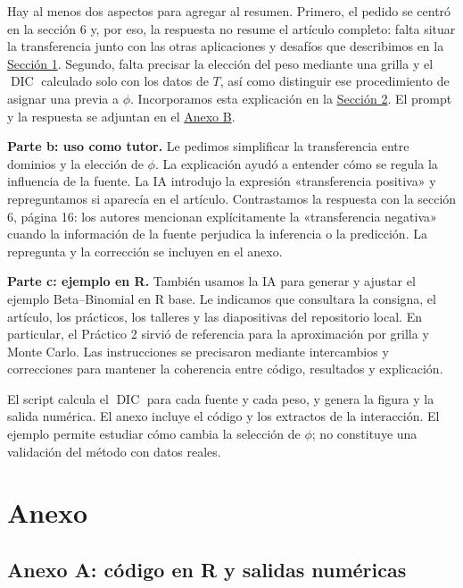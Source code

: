 \documentclass[10pt,a4paper]{article}
\newcommand{\DIC}{\operatorname{DIC}}
\newcommand{\etapa}[1]{\par\smallskip\textbf{#1.}\quad}
\begin{document}
Hay al menos dos aspectos para agregar al resumen. Primero, el pedido se centró en la sección 6 y, por eso, la respuesta no resume el artículo completo: falta situar la transferencia junto con las otras aplicaciones y desafíos que describimos en la \hyperref[sec:ideas]{Sección 1}. Segundo, falta precisar la elección del peso mediante una grilla y el $\DIC$ calculado solo con los datos de $T$, así como distinguir ese procedimiento de asignar una previa a $\phi$. Incorporamos esta explicación en la \hyperref[sec:resultado]{Sección 2}. El prompt y la respuesta se adjuntan en el \hyperref[anexo:ia]{Anexo B}.

\etapa{Parte b: uso como tutor}
Le pedimos simplificar la transferencia entre dominios y la elección de $\phi$. La explicación ayudó a entender cómo se regula la influencia de la fuente. La IA introdujo la expresión «transferencia positiva» y repreguntamos si aparecía en el artículo. Contrastamos la respuesta con la sección 6, página 16: los autores mencionan explícitamente la «transferencia negativa» cuando la información de la fuente perjudica la inferencia o la predicción. La repregunta y la corrección se incluyen en el anexo.

\etapa{Parte c: ejemplo en R}
También usamos la IA para generar y ajustar el ejemplo Beta--Binomial en R base. Le indicamos que consultara la consigna, el artículo, los prácticos, los talleres y las diapositivas del repositorio local. En particular, el Práctico 2 sirvió de referencia para la aproximación por grilla y Monte Carlo. Las instrucciones se precisaron mediante intercambios y correcciones para mantener la coherencia entre código, resultados y explicación.

El script  calcula el $\DIC$ para cada fuente y cada peso, y genera la figura y la salida numérica. El anexo incluye el código y los extractos de la interacción. El ejemplo permite estudiar cómo cambia la selección de $\phi$; no constituye una validación del método con datos reales.

\clearpage
\section{Anexo}\label{sec:anexo}

\subsection{Anexo A: código en R y salidas numéricas}\label{anexo:codigo}
\end{document}

